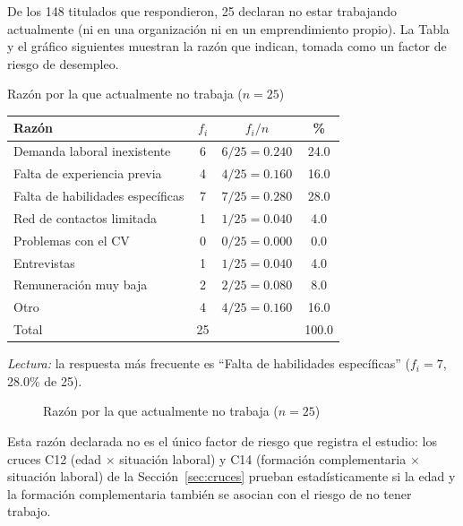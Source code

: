 De los 148 titulados que respondieron, 25 declaran no estar trabajando actualmente (ni en una organización ni en un emprendimiento propio). La Tabla y el gráfico siguientes muestran la razón que indican, tomada como un factor de riesgo de desempleo.

\begin{mitabla}{Razón por la que actualmente no trabaja ($n=25$)}
\begin{tabular}{lccc}
\toprule
Razón & $f_i$ & $f_i / n$ & \% \\
\midrule
Demanda laboral inexistente & 6 & $6/25 = 0.240$ & 24.0 \\
Falta de experiencia previa & 4 & $4/25 = 0.160$ & 16.0 \\
Falta de habilidades específicas & 7 & $7/25 = 0.280$ & 28.0 \\
Red de contactos limitada & 1 & $1/25 = 0.040$ & 4.0 \\
Problemas con el CV & 0 & $0/25 = 0.000$ & 0.0 \\
Entrevistas & 1 & $1/25 = 0.040$ & 4.0 \\
Remuneración muy baja & 2 & $2/25 = 0.080$ & 8.0 \\
Otro & 4 & $4/25 = 0.160$ & 16.0 \\
\midrule
Total & 25 & & 100.0 \\
\bottomrule
\end{tabular}
\end{mitabla}

\textit{Lectura:} la respuesta más frecuente es ``Falta de habilidades específicas'' ($f_i = 7$, 28.0\% de 25).

\begin{figure}[H]
\centering
\caption{Razón por la que actualmente no trabaja ($n=25$)}
\end{figure}

Esta razón declarada no es el único factor de riesgo que registra el estudio: los cruces C12 (edad $\times$ situación laboral) y C14 (formación complementaria $\times$ situación laboral) de la Sección~\ref{sec:cruces} prueban estadísticamente si la edad y la formación complementaria también se asocian con el riesgo de no tener trabajo.

